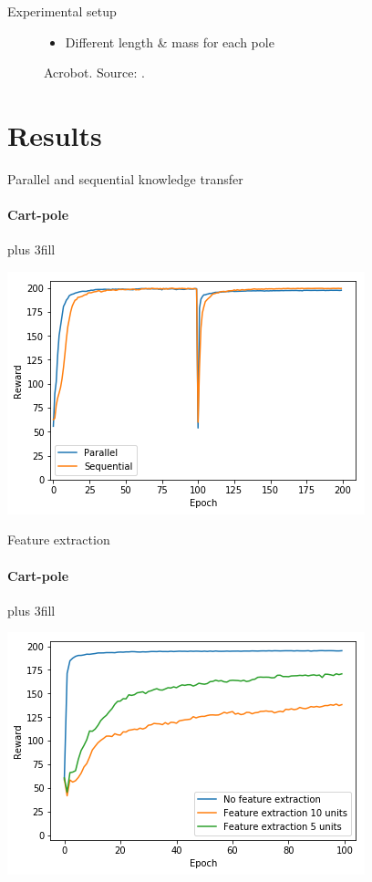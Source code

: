 \begin{frame}[fragile]{Experimental setup}
\begin{figure}[htb]
\begin{minipage}{0.45\textwidth}
            \caption{Acrobot. Source: \cite{fremaux2013reinforcement}.}
            \begin{itemize}
                \item Different length \& mass for each pole
            \end{itemize}
    \end{minipage}
\end{figure}

\end{frame}

\section{Results}
\frame{\sectionpage}
\begin{frame}[fragile]{Parallel and sequential knowledge transfer}
\framesubtitle{Cart-pole}
\vskip0pt plus 3fill
\begin{center}
    \includegraphics[width=.8\linewidth]{results/CartPole/kt_akt/reward_source-target_5tasks.png}
\end{center}
\end{frame}

\begin{frame}[fragile]{Feature extraction}
\framesubtitle{Cart-pole}
\vskip0pt plus 3fill
\begin{center}
    \includegraphics[width=.8\linewidth]{results/CartPole/feature_extraction.png}
\end{center}
\end{frame}


